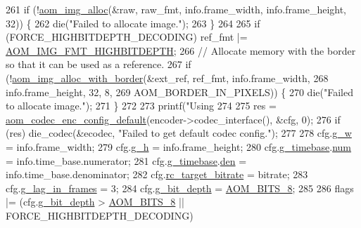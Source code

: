 \begin{DoxyCodeInclude}
{{{{{{{261   \textcolor{keywordflow}{if} (!\hyperlink{aom__image_8h_a570db29fbd122951235a08fe9375f6bb}{aom\_img\_alloc}(&raw, raw\_fmt, info.frame\_width, info.frame\_height, 32)) \{
262     die(\textcolor{stringliteral}{"Failed to allocate image."});
263   \}
264 
265   \textcolor{keywordflow}{if} (FORCE\_HIGHBITDEPTH\_DECODING) ref\_fmt |= \hyperlink{aom__image_8h_a607b37d91f75442f54223ecd85f1b6cb}{AOM\_IMG\_FMT\_HIGHBITDEPTH};
266   \textcolor{comment}{// Allocate memory with the border so that it can be used as a reference.}
267   \textcolor{keywordflow}{if} (!\hyperlink{aom__image_8h_aeb211e5184687f7e10d7c5bed4dcfdcd}{aom\_img\_alloc\_with\_border}(&ext\_ref, ref\_fmt, info.frame\_width,
268                                  info.frame\_height, 32, 8,
269                                  AOM\_BORDER\_IN\_PIXELS)) \{
270     die(\textcolor{stringliteral}{"Failed to allocate image."});
271   \}
272 
273   printf(\textcolor{stringliteral}{"Using %
274 
275   res = \hyperlink{group__encoder_gabe456ab6f99bdebc47018779b75d2521}{aom\_codec\_enc\_config\_default}(encoder->codec\_interface(), &cfg, 0);
276   \textcolor{keywordflow}{if} (res) die\_codec(&ecodec, \textcolor{stringliteral}{"Failed to get default codec config."});
277 
278   cfg.\hyperlink{structaom__codec__enc__cfg_a80cb459c5ef3c7e1516f617c4c9d6eab}{g\_w} = info.frame\_width;
279   cfg.\hyperlink{structaom__codec__enc__cfg_a37b0f57b63bec8d133df8901d4407ee6}{g\_h} = info.frame\_height;
280   cfg.\hyperlink{structaom__codec__enc__cfg_a10664f1fc5b6ec29b77ee13efeeecdf7}{g\_timebase}.\hyperlink{structaom__rational_a7b48174411798c780a15f132c4650839}{num} = info.time\_base.numerator;
281   cfg.\hyperlink{structaom__codec__enc__cfg_a10664f1fc5b6ec29b77ee13efeeecdf7}{g\_timebase}.\hyperlink{structaom__rational_adeddf2ea01c12b7be66536e0a0fb92c5}{den} = info.time\_base.denominator;
282   cfg.\hyperlink{structaom__codec__enc__cfg_ab21539da477dba7506d90353c27d218b}{rc\_target\_bitrate} = bitrate;
283   cfg.\hyperlink{structaom__codec__enc__cfg_a614a49318f2011cc8735d7e51b910fa4}{g\_lag\_in\_frames} = 3;
284   cfg.\hyperlink{structaom__codec__enc__cfg_a76a27f44cded1516803a776a0a7e9038}{g\_bit\_depth} = \hyperlink{group__codec_gga6ed0e98eba4651c1ad845e39498e4153a4c7f55539160206a3fbb2a6cfc9ef89c}{AOM\_BITS\_8};
285 
286   flags |= (cfg.\hyperlink{structaom__codec__enc__cfg_a76a27f44cded1516803a776a0a7e9038}{g\_bit\_depth} > \hyperlink{group__codec_gga6ed0e98eba4651c1ad845e39498e4153a4c7f55539160206a3fbb2a6cfc9ef89c}{AOM\_BITS\_8} || FORCE\_HIGHBITDEPTH\_DECODING)
}}}}}}}}
\end{DoxyCodeInclude}
